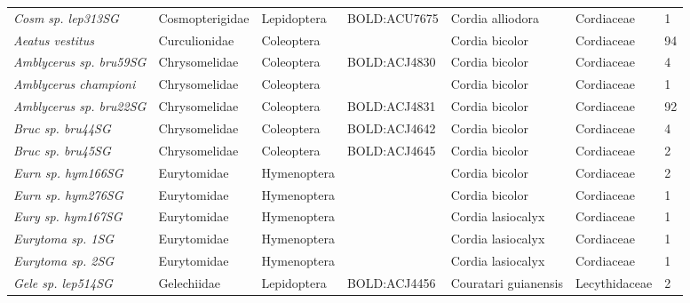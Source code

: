 \documentclass[11pt]{article}
\begin{document}
\begin{landscape}
\begin{longtable}{@{}lllllll@{}}
\textit{Cosm sp. lep313SG}                            & Cosmopterigidae & Lepidoptera  & BOLD:ACU7675 & Cordia alliodora                   & Cordiaceae       & 1     \\
\textit{Aeatus vestitus}                              & Curculionidae   & Coleoptera   &              & Cordia bicolor                     & Cordiaceae       & 94    \\
\textit{Amblycerus sp. bru59SG}                       & Chrysomelidae   & Coleoptera   & BOLD:ACJ4830 & Cordia bicolor                     & Cordiaceae       & 4     \\
\textit{Amblycerus championi}                         & Chrysomelidae   & Coleoptera   &              & Cordia bicolor                     & Cordiaceae       & 1     \\
\textit{Amblycerus sp. bru22SG}                       & Chrysomelidae   & Coleoptera   & BOLD:ACJ4831 & Cordia bicolor                     & Cordiaceae       & 92    \\
\textit{Bruc sp. bru44SG}                             & Chrysomelidae   & Coleoptera   & BOLD:ACJ4642 & Cordia bicolor                     & Cordiaceae       & 4     \\
\textit{Bruc sp. bru45SG}                             & Chrysomelidae   & Coleoptera   & BOLD:ACJ4645 & Cordia bicolor                     & Cordiaceae       & 2     \\
\textit{Eurn sp. hym166SG}                            & Eurytomidae     & Hymenoptera  &              & Cordia bicolor                     & Cordiaceae       & 2     \\
\textit{Eurn sp. hym276SG}                            & Eurytomidae     & Hymenoptera  &              & Cordia bicolor                     & Cordiaceae       & 1     \\
\textit{Eury sp. hym167SG}                            & Eurytomidae     & Hymenoptera  &              & Cordia lasiocalyx                  & Cordiaceae       & 1     \\
\textit{Eurytoma sp. 1SG}                             & Eurytomidae     & Hymenoptera  &              & Cordia lasiocalyx                  & Cordiaceae       & 1     \\
\textit{Eurytoma sp. 2SG}                             & Eurytomidae     & Hymenoptera  &              & Cordia lasiocalyx                  & Cordiaceae       & 1     \\
\textit{Gele sp. lep514SG}                            & Gelechiidae     & Lepidoptera  & BOLD:ACJ4456 & Couratari guianensis               & Lecythidaceae    & 2     \\

\end{longtable}
\end{landscape}
\end{document}
